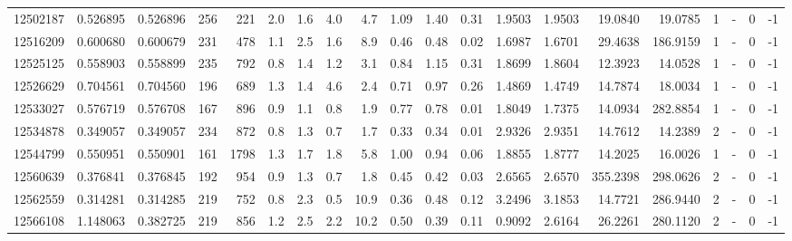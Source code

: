 \begin{tabular}{rrrrrrrrrrrrrrrrrlrl}
  12502187 & 0.526895 &   0.526896 &  256 &  221 &      2.0 &      1.6 &     4.0 &      4.7 &       1.09 &        1.40 &        0.31 &  1.9503 &  1.9503 &   19.0840 &   19.0785 &       1 &             - &        0 &        -1 \\
  12516209 & 0.600680 &   0.600679 &  231 &  478 &      1.1 &      2.5 &     1.6 &      8.9 &       0.46 &        0.48 &        0.02 &  1.6987 &  1.6701 &   29.4638 &  186.9159 &       1 &             - &        0 &        -1 \\
  12525125 & 0.558903 &   0.558899 &  235 &  792 &      0.8 &      1.4 &     1.2 &      3.1 &       0.84 &        1.15 &        0.31 &  1.8699 &  1.8604 &   12.3923 &   14.0528 &       1 &             - &        0 &        -1 \\
  12526629 & 0.704561 &   0.704560 &  196 &  689 &      1.3 &      1.4 &     4.6 &      2.4 &       0.71 &        0.97 &        0.26 &  1.4869 &  1.4749 &   14.7874 &   18.0034 &       1 &             - &        0 &        -1 \\
  12533027 & 0.576719 &   0.576708 &  167 &  896 &      0.9 &      1.1 &     0.8 &      1.9 &       0.77 &        0.78 &        0.01 &  1.8049 &  1.7375 &   14.0934 &  282.8854 &       1 &             - &        0 &        -1 \\
  12534878 & 0.349057 &   0.349057 &  234 &  872 &      0.8 &      1.3 &     0.7 &      1.7 &       0.33 &        0.34 &        0.01 &  2.9326 &  2.9351 &   14.7612 &   14.2389 &       2 &             - &        0 &        -1 \\
  12544799 & 0.550951 &   0.550901 &  161 & 1798 &      1.3 &      1.7 &     1.8 &      5.8 &       1.00 &        0.94 &        0.06 &  1.8855 &  1.8777 &   14.2025 &   16.0026 &       1 &             - &        0 &        -1 \\
  12560639 & 0.376841 &   0.376845 &  192 &  954 &      0.9 &      1.3 &     0.7 &      1.8 &       0.45 &        0.42 &        0.03 &  2.6565 &  2.6570 &  355.2398 &  298.0626 &       2 &             - &        0 &        -1 \\
  12562559 & 0.314281 &   0.314285 &  219 &  752 &      0.8 &      2.3 &     0.5 &     10.9 &       0.36 &        0.48 &        0.12 &  3.2496 &  3.1853 &   14.7721 &  286.9440 &       2 &             - &        0 &        -1 \\
  12566108 & 1.148063 &   0.382725 &  219 &  856 &      1.2 &      2.5 &     2.2 &     10.2 &       0.50 &        0.39 &        0.11 &  0.9092 &  2.6164 &   26.2261 &  280.1120 &       2 &             - &        0 &        -1 \\

\end{tabular}
